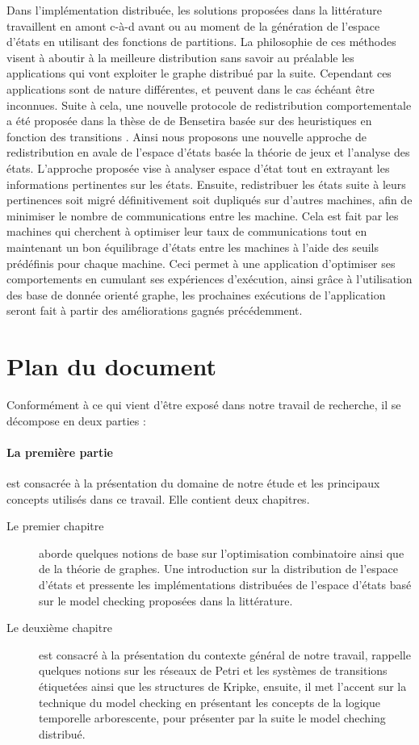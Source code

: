 Dans l’implémentation distribuée, les solutions proposées dans la littérature travaillent en amont c-à-d avant ou au moment de la génération de l’espace d’états en utilisant des fonctions de partitions. La philosophie de ces méthodes visent à aboutir à la meilleure distribution sans savoir au préalable les applications qui vont exploiter le graphe distribué par la suite. Cependant ces applications sont de nature différentes, et peuvent dans le cas échéant être inconnues. Suite à cela, une nouvelle protocole de redistribution comportementale a été proposée dans la thèse de de Bensetira basée sur des heuristiques en fonction des transitions \citep{BENSETIRA2017}. Ainsi nous proposons une nouvelle approche de redistribution en avale de l'espace d'états basée la théorie de jeux et l'analyse des états. L’approche proposée vise à analyser espace d’état tout en extrayant les informations pertinentes sur les états. Ensuite, redistribuer les états suite à leurs pertinences soit migré définitivement soit dupliqués sur d’autres machines, afin de minimiser le nombre de communications entre les machine. Cela est fait par les machines qui cherchent à optimiser leur taux de communications tout en maintenant un bon équilibrage d'états entre les machines à l’aide des seuils prédéfinis pour chaque machine. Ceci permet à une application d'optimiser ses comportements en cumulant ses expériences d’exécution, ainsi grâce à l'utilisation des base de donnée orienté graphe, les prochaines exécutions  de l’application seront fait à partir des améliorations gagnés précédemment.

\section*{Plan du document}
Conformément à ce qui vient d’être exposé dans notre travail de recherche, il se décompose en deux parties :

\paragraph{La première partie} est consacrée à la présentation du domaine de notre étude et les
principaux concepts utilisés dans ce travail. Elle contient deux chapitres.
\begin{description}
	\item[Le premier chapitre] aborde quelques notions de base sur l’optimisation combinatoire ainsi que de la théorie de graphes. Une introduction sur la distribution de l'espace d'états et pressente les implémentations distribuées de l'espace d'états basé sur le model checking proposées dans la littérature.
	\item [Le deuxième chapitre ] est consacré à la présentation du contexte général de notre travail, rappelle quelques notions sur les réseaux de Petri et les systèmes de transitions étiquetées ainsi que les structures de Kripke, ensuite, il met l’accent sur	la technique du model checking en présentant les concepts de la logique temporelle arborescente, pour présenter par la suite le model cheching distribué.
\end{description}

